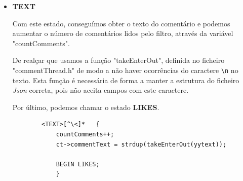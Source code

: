 \documentclass[a4paper,12pt]{report}
\newcommand*{\escape}[1]{\texttt{\textbackslash#1}}
\begin{document}
\vspace{1cm}

\begin{itemize}
    \item 
    \textbf{TEXT}
    \par Com este estado, conseguímos obter o texto do comentário e podemos aumentar o número de comentários lidos pelo filtro, através da variável "countComments".
    \par De realçar que usamos a função "takeEnterOut", definida no ficheiro "commentThread.h" de modo a não haver ocorrências do caractere \escape{n} no texto. Esta função é necessária de forma a manter a estrutura do ficheiro \textit{Json} correta, pois não aceita campos com este caractere.
    \par Por último, podemos chamar o estado \textbf{LIKES}.
    
    \begin{verbatim}
        <TEXT>[^\<]*   {     
            countComments++;
            ct->commentText = strdup(takeEnterOut(yytext));

            BEGIN LIKES;
            }
    \end{verbatim}
    
\end{itemize}

\vspace{1cm}
\end{document}
